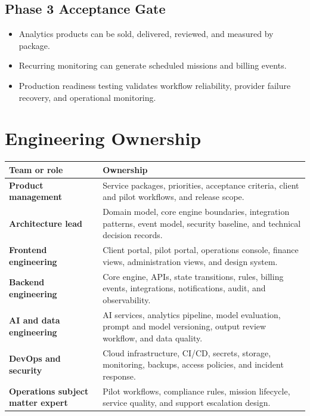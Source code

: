 \documentclass[11pt,a4paper]{article}
\begin{document}
\subsection*{Phase 3 Acceptance Gate}

\begin{itemize}[leftmargin=*]
    \item Analytics products can be sold, delivered, reviewed, and measured by package.
    \item Recurring monitoring can generate scheduled missions and billing events.
    \item Production readiness testing validates workflow reliability, provider failure recovery, and operational monitoring.
\end{itemize}

\section{Engineering Ownership}

\begin{longtable}{>{\bfseries}p{}p{}}
\toprule
Team or role & Ownership \\
\midrule
Product management & Service packages, priorities, acceptance criteria, client and pilot workflows, and release scope. \\
Architecture lead & Domain model, core engine boundaries, integration patterns, event model, security baseline, and technical decision records. \\
Frontend engineering & Client portal, pilot portal, operations console, finance views, administration views, and design system. \\
Backend engineering & Core engine, APIs, state transitions, rules, billing events, integrations, notifications, audit, and observability. \\
AI and data engineering & AI services, analytics pipeline, model evaluation, prompt and model versioning, output review workflow, and data quality. \\
DevOps and security & Cloud infrastructure, CI/CD, secrets, storage, monitoring, backups, access policies, and incident response. \\
Operations subject matter expert & Pilot workflows, compliance rules, mission lifecycle, service quality, and support escalation design. \\
\bottomrule
\end{longtable}
\end{document}
